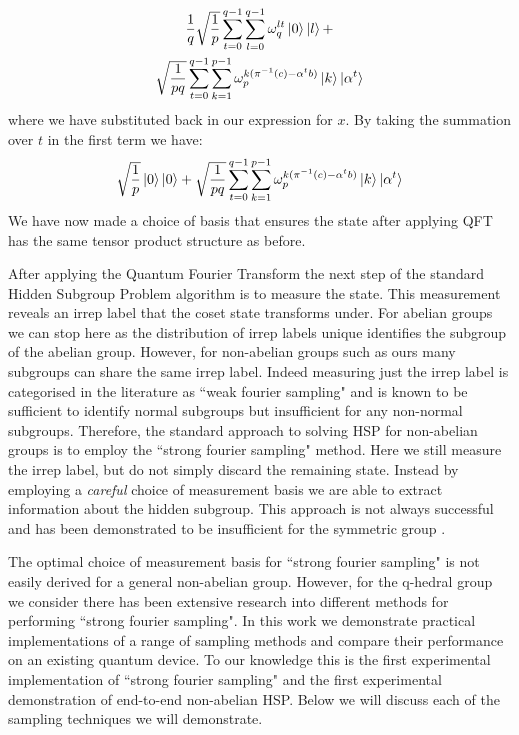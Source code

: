 \documentclass[aps,floatfix,10pt,amssymb,amsfont,amsmath,superscriptaddress,float,nofootinbib,longbibliography,nobalancelastpage,twocolumn]{revtex4-2}
\begin{document}
\begin{multline}
     \frac{1}{q}\sqrt{\frac{1}{p}}\sum_{t=0}^{q-1}  \sum_{l=0}^{q-1}\omega^{lt}_q\ket{0}\ket{l} + \\ \sqrt{\frac{1}{pq}}\sum_{t=0}^{q-1} \sum_{k=1}^{p-1} \omega_p^{k (\pi^{-1}(c) - \alpha^tb)}\ket{k}\ket{\alpha^t}
\end{multline}
where we have substituted back in our expression for $x$. By taking the summation over $t$ in the first term we have:
\begin{equation}
     \sqrt{\frac{1}{p}} \ket{0}\ket{0} +  \sqrt{\frac{1}{pq}}\sum_{t=0}^{q-1} \sum_{k=1}^{p-1} \omega_p^{k (\pi^{-1}(c) - \alpha^tb)}\ket{k}\ket{\alpha^t}
     \label{eq:finalqftstate}
\end{equation}
We have now made a choice of basis that ensures the state after applying QFT has the same tensor product structure as before. 

After applying the Quantum Fourier Transform the next step of the standard Hidden Subgroup Problem algorithm is to measure the state. This measurement reveals an irrep label that the coset state transforms under. For abelian groups we can stop here as the distribution of irrep labels unique identifies the subgroup of the abelian group. However, for non-abelian groups such as ours many subgroups can share the same irrep label. Indeed measuring just the irrep label is categorised in the literature as ``weak fourier sampling" and is known to be sufficient to identify normal subgroups but insufficient for any non-normal subgroups. Therefore, the standard approach to solving HSP for non-abelian groups is to employ the ``strong fourier sampling" method. Here we still measure the irrep label, but do not simply discard the remaining state. Instead by employing a \emph{careful} choice of measurement basis we are able to extract information about the hidden subgroup. This approach is not always successful and has been demonstrated to be insufficient for the symmetric group \cite{moore2008symmetric}.

The optimal choice of measurement basis for ``strong fourier sampling" is not easily derived for a general non-abelian group. However, for the q-hedral group we consider there has been extensive research into different methods for performing ``strong fourier sampling". In this work we demonstrate practical implementations of a range of sampling methods and compare their performance on an existing quantum device. To our knowledge this is the first experimental implementation of ``strong fourier sampling" and the first experimental demonstration of end-to-end non-abelian HSP. Below we will discuss each of the sampling techniques we will demonstrate.
\end{document}
